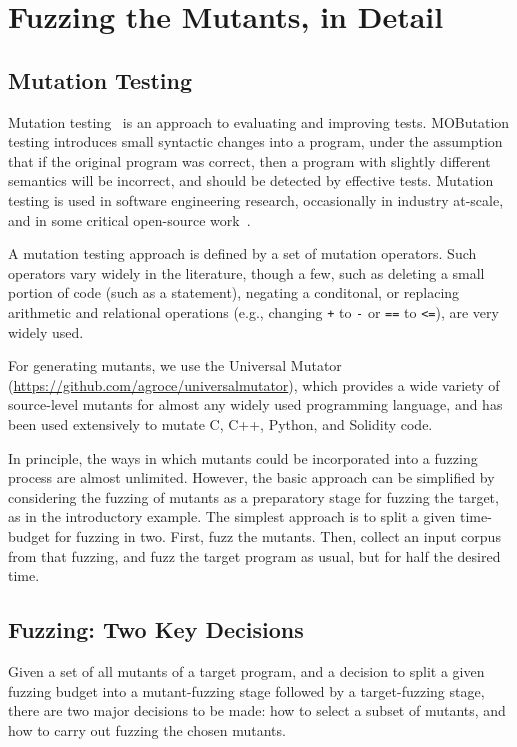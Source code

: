 \section{Fuzzing the Mutants, in Detail}


\subsection{Mutation Testing}

Mutation
testing~\cite{MutationSurvey,budd1979mutation,demillo1978hints} is an
approach to evaluating and improving tests.  MOButation testing
introduces small syntactic changes into a program, under the
assumption that if the original program was correct, then a program
with slightly different semantics will be incorrect, and should be
detected by effective tests.  Mutation testing is used in software
engineering research, occasionally in industry at-scale, and in some
critical open-source work~\cite{mutKernel,mutGoogle,mutFacebook}.

A mutation testing approach is defined by a set of mutation operators.
Such operators vary widely in the literature, though a few, such as
deleting a small portion of code (such as a statement), negating a
conditonal, or replacing arithmetic and relational operations (e.g.,
changing {\tt +} to {\tt -} or {\tt ==} to {\tt <=}), are very widely
used.

For generating mutants, we use the Universal Mutator \cite{regexpMut}
(\url{https://github.com/agroce/universalmutator}), which provides a
wide variety of source-level mutants for almost any widely used
programming language, and has been used extensively to mutate C, C++,
Python, and Solidity code.

In principle, the ways in which mutants could be incorporated into a
fuzzing process are almost unlimited.  However, the basic approach can
be simplified by considering the fuzzing of mutants as a preparatory
stage for fuzzing the target, as in the introductory example.  The
simplest approach is to split a given time-budget for fuzzing in two.
First, fuzz the mutants.  Then, collect an input corpus from that
fuzzing, and fuzz the target program as usual, but for half the
desired time.

\subsection{Fuzzing: Two Key Decisions}

Given a set of all mutants of a target program, and a decision to
split a given fuzzing budget into a mutant-fuzzing stage followed by a
target-fuzzing stage, there are two major decisions to be made: how to
select a subset of mutants, and how to carry out fuzzing the chosen
mutants.

